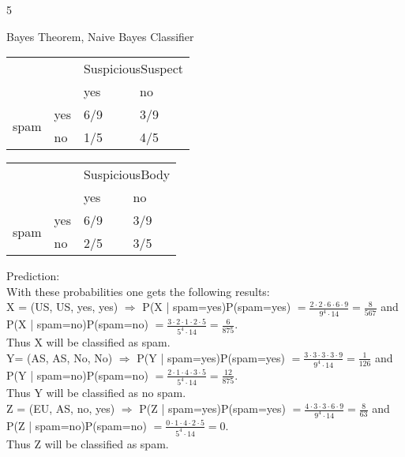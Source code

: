 \documentclass{article}
\begin{document}
\begin{ukon-infie}[29.11.17]{5}
\begin{exercise}[p=10]{Bayes Theorem, Naive Bayes Classifier}
{\begin{tabular}{|l|l|l|l|}
\hline
\multicolumn{2}{|l|}{\multirow{2}{*}{}} & \multicolumn{2}{l|}{SuspiciousSuspect} \\ \cline{3-4} 
\multicolumn{2}{|l|}{}                  & yes                & no                \\ \hline
\multirow{2}{*}{spam}       & yes       & 6/9                & 3/9               \\ \cline{2-4} 
                            & no        & 1/5                & 4/5               \\ \hline
\end{tabular}
\begin{tabular}{|l|l|l|l|}
\hline
\multicolumn{2}{|l|}{\multirow{2}{*}{}} & \multicolumn{2}{l|}{SuspiciousBody} \\ \cline{3-4} 
\multicolumn{2}{|l|}{}                  & yes              & no               \\ \hline
\multirow{2}{*}{spam}       & yes       & 6/9              & 3/9              \\ \cline{2-4} 
                            & no        & 2/5              & 3/5              \\ \hline
\end{tabular}
Prediction:\\
With these probabilities one gets the following results:\\
X = (US, US, yes, yes) $\Rightarrow$ P(X | spam=yes)P(spam=yes) $= \frac{2 \cdot 2 \cdot 6 \cdot 6 \cdot 9}{9^4 \cdot 14} = \frac{8}{567}$ and\\
P(X | spam=no)P(spam=no) $ = \frac{3 \cdot 2 \cdot 1 \cdot 2 \cdot 5}{5^4 \cdot 14} = \frac{6}{875}$.\\
Thus X will be classified as  spam.\\

Y= (AS, AS, No, No) $\Rightarrow$ P(Y | spam=yes)P(spam=yes) $= \frac{3 \cdot 3 \cdot 3 \cdot 3 \cdot 9}{9^4 \cdot 14} = \frac{1}{126}$ and\\
P(Y | spam=no)P(spam=no) $ = \frac{2 \cdot 1 \cdot 4 \cdot 3 \cdot 5}{5^4 \cdot 14} = \frac{12}{875}$.\\
Thus Y will be classified as  no spam.\\

Z = (EU, AS, no, yes) $\Rightarrow$ P(Z | spam=yes)P(spam=yes) $= \frac{4 \cdot 3 \cdot 3 \cdot 6 \cdot 9}{9^4 \cdot 14} = \frac{8}{63}$ and\\
P(Z | spam=no)P(spam=no) $ = \frac{0 \cdot 1 \cdot 4 \cdot 2 \cdot 5}{5^4 \cdot 14} = 0$.\\
Thus Z will be classified as  spam.\\




}
\end{exercise}
\end{ukon-infie}
\end{document}
